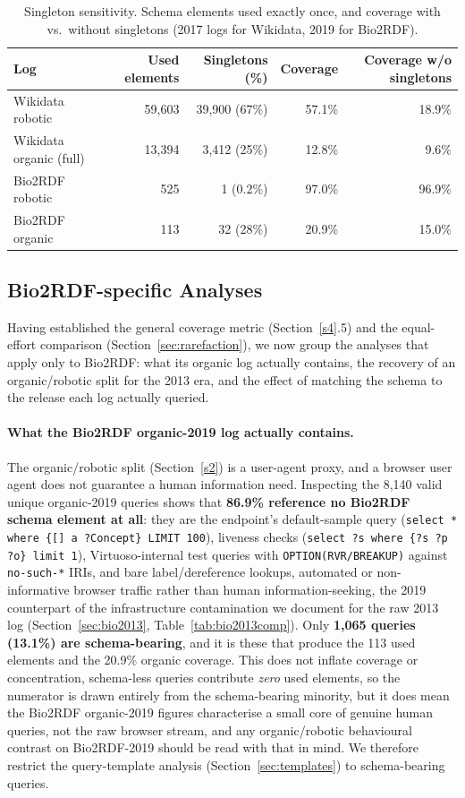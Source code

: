 \documentclass[sw]{iosart2x}
\begin{document}
\begin{table}[ht]
\centering
\caption{Singleton sensitivity. Schema elements used exactly once, and coverage with vs.\ without singletons (2017 logs for Wikidata, 2019 for Bio2RDF).}
\label{tab:singletons}
\begin{tabular}{l|r|r|r|r}
\hline
Log & Used elements & Singletons (\%) & Coverage & Coverage w/o singletons \\
\hline
Wikidata robotic & 59,603 & 39,900 (67\%) & 57.1\% & 18.9\% \\
Wikidata organic (full) & 13,394 & 3,412 (25\%) & 12.8\% & 9.6\% \\
Bio2RDF robotic & 525 & 1 (0.2\%) & 97.0\% & 96.9\% \\
Bio2RDF organic & 113 & 32 (28\%) & 20.9\% & 15.0\% \\
\hline
\end{tabular}
\end{table}


\subsection{Bio2RDF-specific Analyses}\label{sec:bio2rdfresults}
Having established the general coverage metric (Section~\ref{s4}.5) and the equal-effort comparison (Section~\ref{sec:rarefaction}), we now group the analyses that apply only to Bio2RDF: what its organic log actually contains, the recovery of an organic/robotic split for the 2013 era, and the effect of matching the schema to the release each log actually queried.

\paragraph{\textbf{What the Bio2RDF organic-2019 log actually contains.}} The organic/robotic split (Section~\ref{s2}) is a user-agent proxy, and a browser user agent does not guarantee a human information need. Inspecting the 8{,}140 valid unique organic-2019 queries shows that \textbf{86.9\% reference no Bio2RDF schema element at all}: they are the endpoint's default-sample query (\texttt{select * where \{[] a ?Concept\} LIMIT 100}), liveness checks (\texttt{select ?s where \{?s ?p ?o\} limit 1}), Virtuoso-internal test queries with \texttt{OPTION(RVR/BREAKUP)} against \texttt{no-such-*} IRIs, and bare label/dereference lookups, automated or non-informative browser traffic rather than human information-seeking, the 2019 counterpart of the infrastructure contamination we document for the raw 2013 log (Section~\ref{sec:bio2013}, Table~\ref{tab:bio2013comp}). Only \textbf{1{,}065 queries (13.1\%) are schema-bearing}, and it is these that produce the 113 used elements and the 20.9\% organic coverage. This does not inflate coverage or concentration, schema-less queries contribute \emph{zero} used elements, so the numerator is drawn entirely from the schema-bearing minority, but it does mean the Bio2RDF organic-2019 figures characterise a small core of genuine human queries, not the raw browser stream, and any organic/robotic behavioural contrast on Bio2RDF-2019 should be read with that in mind. We therefore restrict the query-template analysis (Section~\ref{sec:templates}) to schema-bearing queries.
\end{document}
